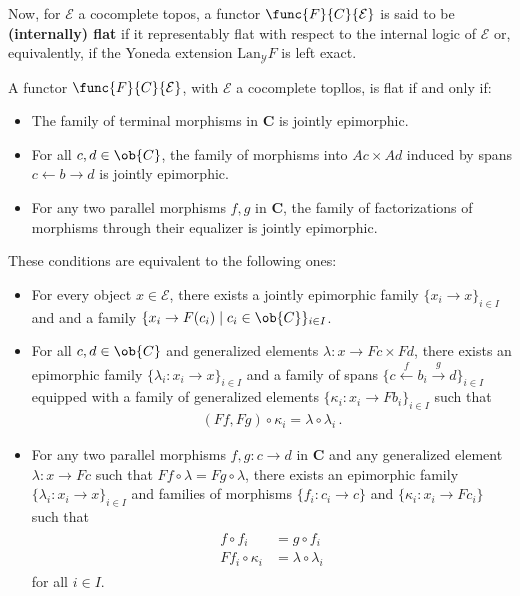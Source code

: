     Now, for $\mathcal{E}$ a cocomplete topos, a functor $\func{F}{C}{\mathcal{E}}$ is said to be \textbf{(internally) flat} if it representably flat with respect to the internal logic of $\mathcal{E}$ or, equivalently, if the Yoneda extension $\mathrm{Lan}_{\mathcal{Y}}F$ is left exact.
    \begin{property}
        A functor $\func{F}{C}{\mathcal{E}}$, with $\mathcal{E}$ a cocomplete topllos, is flat if and only if:
        \begin{itemize}
            \item The family of terminal morphisms in $\mathbf{C}$ is jointly epimorphic.
            \item For all $c,d\in\ob{C}$, the family of morphisms into $Ac\times Ad$ induced by spans $c\leftarrow b\rightarrow d$ is jointly epimorphic.
            \item For any two parallel morphisms $f,g$ in $\mathbf{C}$, the family of factorizations of morphisms through their equalizer is jointly epimorphic.
        \end{itemize}
        These conditions are equivalent to the following ones:
        \begin{itemize}
            \item For every object $x\in\mathcal{E}$, there exists a jointly epimorphic family $\{x_i\rightarrow x\}_{i\in I}$ and and a family $\{x_i\rightarrow F(c_i)\mid c_i\in\ob{C}\}_{i\in I}$.
            \item For all $c,d\in\ob{C}$ and generalized elements $\lambda:x\rightarrow Fc\times Fd$, there exists an epimorphic family $\{\lambda_i:x_i\rightarrow x\}_{i\in I}$ and a family of spans $\{c\xleftarrow{f}b_i\xrightarrow{g}d\}_{i\in I}$ equipped with a family of generalized elements $\{\kappa_i:x_i\rightarrow Fb_i\}_{i\in I}$ such that
            \begin{gather}
                (Ff,Fg)\circ\kappa_i = \lambda\circ\lambda_i\,.
            \end{gather}
            \item For any two parallel morphisms $f,g:c\rightarrow d$ in $\mathbf{C}$ and any generalized element $\lambda:x\rightarrow Fc$ such that $Ff\circ\lambda=Fg\circ\lambda$, there exists an epimorphic family $\{\lambda_i:x_i\rightarrow x\}_{i\in I}$ and families of morphisms $\{f_i:c_i\rightarrow c\}$ and $\{\kappa_i:x_i\rightarrow Fc_i\}$ such that
            \begin{gather}
                \begin{aligned}
                    f\circ f_i &= g\circ f_i\\
                    Ff_i\circ\kappa_i &= \lambda\circ\lambda_i
                \end{aligned}
            \end{gather}
            for all $i\in I$.
        \end{itemize}
    \end{property}

